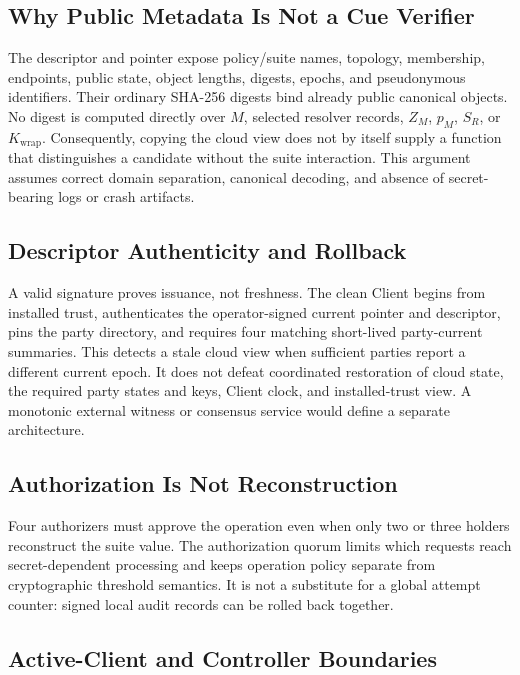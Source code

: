 \documentclass[sigconf,anonymous]{acmart}
\begin{document}
\subsection{Why Public Metadata Is Not a Cue Verifier}

The descriptor and pointer expose policy/suite names, topology, membership,
endpoints, public state, object lengths, digests, epochs, and pseudonymous
identifiers. Their ordinary SHA-256 digests bind already public canonical
objects. No digest is computed directly over \(M\), selected resolver records,
\(Z_M\), \(p_M\), \(S_R\), or \(K_{\mathrm{wrap}}\). Consequently, copying the
cloud view does not by itself supply a function that distinguishes a candidate
without the suite interaction. This argument assumes correct domain
separation, canonical decoding, and absence of secret-bearing logs or crash
artifacts.

\subsection{Descriptor Authenticity and Rollback}

A valid signature proves issuance, not freshness. The clean Client begins from
installed trust, authenticates the operator-signed current pointer and
descriptor, pins the party directory, and requires four matching short-lived
party-current summaries. This detects a stale cloud view when sufficient
parties report a different current epoch. It does not defeat coordinated
restoration of cloud state, the required party states and keys, Client clock,
and installed-trust view. A monotonic external witness or consensus service
would define a separate architecture.

\subsection{Authorization Is Not Reconstruction}

Four authorizers must approve the operation even when only two or three
holders reconstruct the suite value. The authorization quorum limits which
requests reach secret-dependent processing and keeps operation policy separate
from cryptographic threshold semantics. It is not a substitute for a global
attempt counter: signed local audit records can be rolled back together.

\subsection{Active-Client and Controller Boundaries}
\end{document}
